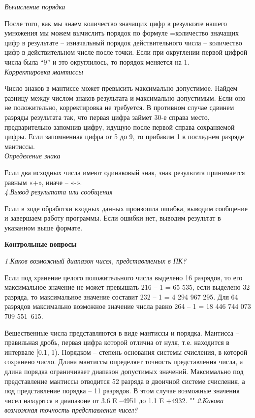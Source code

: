 \documentclass[a4paper, 12pt, -shell-escape]{article}  %
\begin{document}
	\textit{Вычисление порядка}
	
	После того, как мы знаем количество значащих цифр в результате нашего умножения мы можем вычислить порядок по формуле =количество значащих цифр в результате – изначальный порядок действительного числа – количество цифр в действительном числе после точки. Если при округлении первой цифрой числа была “9” и это округлилось, то порядок меняется на 1.\\
	
	\textit{Корректировка мантиссы}
	
	Число знаков в мантиссе может превысить максимально допустимое. Найдем разницу между числом знаков результата и максимально допустимым. Если оно не положительно, корректировка не требуется. В противном случае сдвинем разряды результата так, что первая цифра займет 30-е справа место, предварительно запомнив цифру, идущую после первой справа сохраняемой цифры. Если запомненная цифра от 5 до 9, то прибавим 1 в последнем разряде мантиссы.\\
	
	\textit{Определение знака}
	
	Если два исходных числа имеют одинаковый знак, знак результата принимается равным «+», иначе – «-».\\
	
	\textit{4.Вывод результата или сообщения}
	
	Если в ходе обработки входных данных произошла ошибка, выводим сообщение и завершаем работу программы. Если ошибки нет, выводим результат в указанном выше формате.
	
	\newpage
	\begin{center}
		\begin{large}
			\noindent\textbf{Контрольные вопросы}\\
		\end{large}
	\end{center}
	\textit{1.Каков возможный диапазон чисел, представляемых в ПК?}
	
	Если под хранение целого положительного числа выделено 16 разрядов, то его максимальное значение не может превышать 216 – 1 = 65 535, если выделено 32 разряда, то максимальное значение составит 232 – 1 = 4 294 967 295. Для 64 разрядов максимально возможное значение числа равно 264 – 1 = 18 446 744 073 709 551 615.
	
	Вещественные числа представляются в виде мантиссы и порядка. Мантисса – правильная дробь, первая цифра которой отлична от нуля, т.е. находится в интервале [0.1, 1). Порядком – степень основания системы счисления, в которой сохранено число. 
	Длина мантиссы определяет точность представления числа, а длина порядка ограничивает диапазон допустимых значений. Максимально под представление мантиссы отводится 52 разряда в двоичной системе счисления, а под представление порядка – 11 разрядов. В этом случае возможные значения чисел находятся в диапазоне от 3.6 E –4951 до 1.1 E +4932.
	""\newline\newline
	\textit{2.Какова возможная точность представления чисел?}
	
\end{document}
